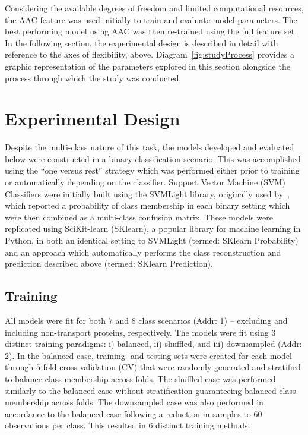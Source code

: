 Considering the available degrees of freedom and limited computational resources, the AAC feature was used initially
to train and evaluate model parameters. The best performing model using AAC was then re-trained using the full feature
set. In the following section, the experimental design is described in detail with reference to the axes of flexibility,
above. Diagram~\ref{fig:studyProcess} provides a graphic representation of the parameters explored in this
section alongside the process through which the study was conducted.

\section{Experimental Design}
\label{sec:experimentaldesign}
Despite the multi-class nature of this task, the models developed and evaluated below were constructed in a binary
classification scenario. This was accomplished using the ``one versus rest'' strategy which was performed either prior
to training or automatically depending on the classifier. Support Vector Machine (SVM) Classifiers were initially built
using the SVMLight library, originally used by~\cite{mishra_prediction_2014}, which reported a probability of class
membership in each binary setting which were then combined as a multi-class confusion matrix. These models were
replicated using SciKit-learn (SKlearn), a popular library for machine learning in Python, in both an identical setting
to SVMLight (termed: SKlearn Probability) and an approach which automatically performs the class reconstruction and
prediction described above (termed: SKlearn Prediction). 

\subsection{Training}
All models were fit for both $7$ and $8$ class scenarios (Addr: 1) -- excluding and including non-transport proteins,
respectively. The models were fit using $3$ distinct training paradigms: i) balanced, ii) shuffled, and iii)
downsampled (Addr: 2). In the balanced case, training- and testing-sets were created for each model through $5$-fold
cross validation (CV) that were randomly generated and stratified to balance class membership across folds. The
shuffled case was performed similarly to the balanced case without stratification guaranteeing balanced class membership
across folds. The downsampled case was also performed in accordance to the balanced case following a reduction in
samples to $60$ observations per class. This resulted in $6$ distinct training methods.

